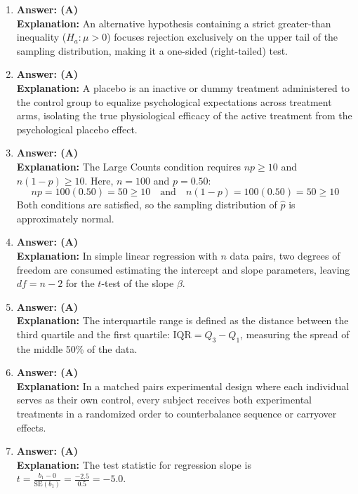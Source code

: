 \begin{enumerate}[leftmargin=1.5em]
  \item \textbf{Answer: (A)} \\
  \textbf{Explanation:} An alternative hypothesis containing a strict greater-than inequality ($H_a: \mu > 0$) focuses rejection exclusively on the upper tail of the sampling distribution, making it a one-sided (right-tailed) test.

  \item \textbf{Answer: (A)} \\
  \textbf{Explanation:} A placebo is an inactive or dummy treatment administered to the control group to equalize psychological expectations across treatment arms, isolating the true physiological efficacy of the active treatment from the psychological placebo effect.

  \item \textbf{Answer: (A)} \\
  \textbf{Explanation:} The Large Counts condition requires $np \ge 10$ and $n(1 - p) \ge 10$. Here, $n = 100$ and $p = 0.50$:
  \[ np = 100(0.50) = 50 \ge 10 \quad \text{and} \quad n(1 - p) = 100(0.50) = 50 \ge 10 \]
  Both conditions are satisfied, so the sampling distribution of $\hat{p}$ is approximately normal.

  \item \textbf{Answer: (A)} \\
  \textbf{Explanation:} In simple linear regression with $n$ data pairs, two degrees of freedom are consumed estimating the intercept and slope parameters, leaving $df = n - 2$ for the $t$-test of the slope $\beta$.

  \item \textbf{Answer: (A)} \\
  \textbf{Explanation:} The interquartile range is defined as the distance between the third quartile and the first quartile: $\text{IQR} = Q_3 - Q_1$, measuring the spread of the middle 50\% of the data.

  \item \textbf{Answer: (A)} \\
  \textbf{Explanation:} In a matched pairs experimental design where each individual serves as their own control, every subject receives both experimental treatments in a randomized order to counterbalance sequence or carryover effects.

  \item \textbf{Answer: (A)} \\
  \textbf{Explanation:} The test statistic for regression slope is $t = \frac{b_1 - 0}{\text{SE}(b_1)} = \frac{-2.5}{0.5} = -5.0$.


\end{enumerate}
